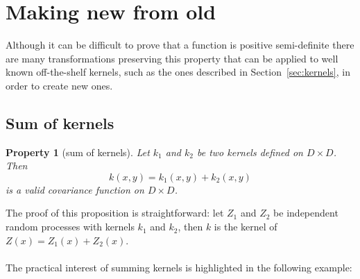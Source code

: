 \documentclass[twoside,openright]{report}
\newtheorem{property}{Property}
\begin{document}
\section{Making new from old}
Although it can be difficult to prove that a function is positive semi-definite there are many transformations preserving this property that can be applied to well known off-the-shelf kernels, such as the ones described in Section~\ref{sec:kernels}, in order to create new ones.

\subsection{Sum of kernels}

\begin{property}[sum of kernels]
	Let $k_1$ and $k_2$ be two kernels defined on $D \times D$. Then 
	\begin{equation}
		k(x,y) = k_1(x,y) + k_2(x,y)
	\end{equation}
	is a valid covariance function on $D \times D$.
\end{property}
The proof of this proposition is straightforward: let $Z_1$ and $Z_2$ be independent random processes with kernels $k_1$ and $k_2$, then $k$ is the kernel of $Z(x) = Z_1(x) + Z_2(x)$.

\paragraph{}
The practical interest of summing kernels is highlighted in the following example:
\end{document}
